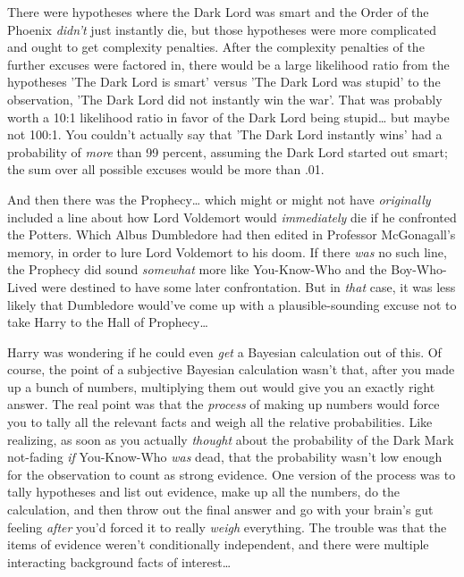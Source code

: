 There were hypotheses where the Dark Lord was smart and the Order of the 
Phoenix \emph{didn't} just instantly die, but those hypotheses were more 
complicated and ought to get complexity penalties. After the complexity 
penalties of the further excuses were factored in, there would be a large 
likelihood ratio from the hypotheses 'The Dark Lord is smart' versus 'The Dark 
Lord was stupid' to the observation, 'The Dark Lord did not instantly win the 
war'. That was probably worth a 10:1 likelihood ratio in favor of the Dark Lord 
being stupid{\ldots} but maybe not 100:1. You couldn't actually say that 'The 
Dark Lord instantly wins' had a probability of \emph{more} than 99 percent, 
assuming the Dark Lord started out smart; the sum over all possible excuses 
would be more than .01.

And then there was the Prophecy{\ldots} which might or might not have 
\emph{originally} included a line about how Lord Voldemort would 
\emph{immediately} die if he confronted the Potters. Which Albus Dumbledore had 
then edited in Professor McGonagall's memory, in order to lure Lord Voldemort 
to his doom. If there \emph{was} no such line, the Prophecy did sound 
\emph{somewhat} more like You-Know-Who and the Boy-Who-Lived were destined to 
have some later confrontation. But in \emph{that} case, it was less likely that 
Dumbledore would've come up with a plausible-sounding excuse not to take Harry 
to the Hall of Prophecy{\ldots}

Harry was wondering if he could even \emph{get} a Bayesian calculation out of 
this. Of course, the point of a subjective Bayesian calculation wasn't that, 
after you made up a bunch of numbers, multiplying them out would give you an 
exactly right answer. The real point was that the \emph{process} of making up 
numbers would force you to tally all the relevant facts and weigh all the 
relative probabilities. Like realizing, as soon as you actually \emph{thought} 
about the probability of the Dark Mark not-fading \emph{if} You-Know-Who 
\emph{was} dead, that the probability wasn't low enough for the observation to 
count as strong evidence. One version of the process was to tally hypotheses 
and list out evidence, make up all the numbers, do the calculation, and then 
throw out the final answer and go with your brain's gut feeling \emph{after} 
you'd forced it to really \emph{weigh} everything. The trouble was that the 
items of evidence weren't conditionally independent, and there were multiple 
interacting background facts of interest{\ldots}

